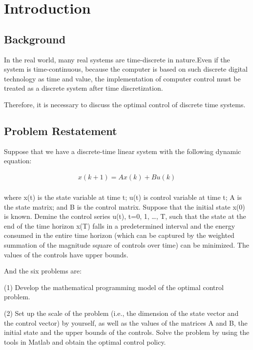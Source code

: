 \documentclass{mcmthesis}
\begin{document}
\newpage

\pagestyle{fancy}

\setcounter{page}{1}
\section{Introduction}
\subsection{Background}

In the real world, many real systems are time-discrete in nature.Even if the system is time-continuous, because the computer is based on such discrete digital technology as time and value, the implementation of computer control must be treated as a discrete system after time discretization.\cite{journals/kybernetika/StechaKKL73}

Therefore, it is necessary to discuss the optimal control of discrete time systems.


\subsection{Problem Restatement}

Suppose that we have a discrete-time linear system with the following dynamic equation:

$$\begin{array}{l}
x(k+1)=A x(k)+B u(k) \\
\end{array}$$

where x(t) is the state variable at time t; u(t) is control variable at time t; A is the state matrix; and B is the control matrix. Suppose that the initial state x(0) is known. Demine the control series u(t), t=0, 1, …, T, such that the state at the end of the time horizon x(T) falls in a predetermined interval and the energy consumed in the entire time horizon (which can be captured by the weighted summation of the magnitude square of controls over time) can be minimized. The values of the controls have upper bounds.

And the six problems are:

(1)	Develop the mathematical programming model of the optimal control problem.

(2)	Set up the scale of the problem (i.e., the dimension of the state vector and the control vector) by yourself, as well as the values of the matrices A and B, the initial state and the upper bounds of the controls. Solve the problem by using the tools in Matlab and obtain the optimal control policy.
\end{document}
